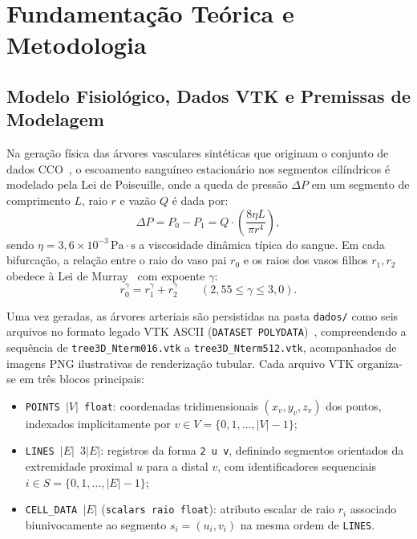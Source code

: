 \documentclass[11pt, a4paper]{article}
\begin{document}
\section{Fundamentação Teórica e Metodologia}

\subsection{Modelo Fisiológico, Dados VTK e Premissas de Modelagem}

Na geração física das árvores vasculares sintéticas que originam o conjunto de dados CCO~\cite{schreiner1993, karch1999cco}, o escoamento sanguíneo estacionário nos segmentos cilíndricos é modelado pela Lei de Poiseuille, onde a queda de pressão $\Delta P$ em um segmento de comprimento $L$, raio $r$ e vazão $Q$ é dada por:
\begin{equation}
  \Delta P = P_0 - P_1 = Q \cdot \left( \frac{8 \eta L}{\pi r^4} \right),
  \label{eq:poiseuille}
\end{equation}
sendo $\eta = 3{,}6 \times 10^{-3}\,\text{Pa}\cdot\text{s}$ a viscosidade dinâmica típica do sangue. Em cada bifurcação, a relação entre o raio do vaso pai $r_0$ e os raios dos vasos filhos $r_1, r_2$ obedece à Lei de Murray~\cite{murray1926, zamir1988} com expoente $\gamma$:
\begin{equation}
  r_0^\gamma = r_1^\gamma + r_2^\gamma \qquad (2{,}55 \le \gamma \le 3{,}0).
  \label{eq:murray}
\end{equation}

Uma vez geradas, as árvores arteriais são persistidas na pasta \texttt{dados/} como seis arquivos no formato legado VTK ASCII (\texttt{DATASET POLYDATA})~\cite{vtkformat}, compreendendo a sequência de \texttt{tree3D\_Nterm016.vtk} a \texttt{tree3D\_Nterm512.vtk}, acompanhados de imagens PNG ilustrativas de renderização tubular. Cada arquivo VTK organiza-se em três blocos principais:
\begin{itemize}[leftmargin=*]
  \item \texttt{POINTS $|V|$ float}: coordenadas tridimensionais $(x_v, y_v, z_v)$ dos pontos, indexados implicitamente por $v \in V = \{0, 1, \dots, |V|-1\}$;
  \item \texttt{LINES $|E|$ $3|E|$}: registros da forma \texttt{2 u v}, definindo segmentos orientados da extremidade proximal $u$ para a distal $v$, com identificadores sequenciais $i \in S = \{0, 1, \dots, |E|-1\}$;
  \item \texttt{CELL\_DATA $|E|$} (\texttt{scalars raio float}): atributo escalar de raio $r_i$ associado biunivocamente ao segmento $s_i = (u_i, v_i)$ na mesma ordem de \texttt{LINES}.
\end{itemize}
\end{document}
